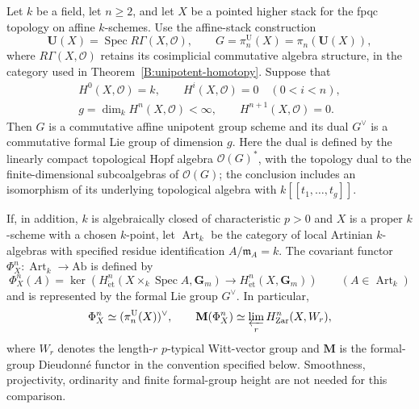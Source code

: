 \begin{theorem}\label{B:formal-homotopy}
Let $k$ be a field, let $n\geq2$, and let $X$ be a pointed higher stack
for the fpqc topology on affine $k$-schemes.  Use the affine-stack
construction
\[
 \mathbf U(X)=\operatorname{Spec}R\Gamma(X,\mathcal O),
 \qquad G=\pi_n^{\mathrm U}(X)=\pi_n(\mathbf U(X)),
\]
where $R\Gamma(X,\mathcal O)$ retains its cosimplicial commutative
algebra structure, in the category used in
Theorem~\ref{B:unipotent-homotopy}.
Suppose that
\[
 \begin{gathered}
 H^0(X,\mathcal O)=k,\qquad
 H^i(X,\mathcal O)=0\quad(0<i<n),\\
 g=\dim_k H^n(X,\mathcal O)<\infty,
 \qquad H^{n+1}(X,\mathcal O)=0.
 \end{gathered}
\]
Then $G$ is a commutative affine unipotent group scheme and its dual
$G^\vee$ is a commutative formal Lie group of dimension $g$.
Here the dual is defined by the linearly compact topological Hopf algebra
$\mathcal O(G)^*$, with the topology dual to the finite-dimensional
subcoalgebras of $\mathcal O(G)$; the conclusion includes an isomorphism
of its underlying topological algebra with $k[[t_1,\ldots,t_g]]$.

If, in addition, $k$ is algebraically closed of characteristic $p>0$
and $X$ is a proper $k$-scheme with a chosen $k$-point, let
$\operatorname{Art}_k$ be the category of local Artinian $k$-algebras
with specified residue identification $A/\mathfrak m_A=k$.  The covariant functor $\Phi_X^n:\operatorname{Art}_k\to\mathrm{Ab}$
is defined by
\[
 \Phi_X^n(A)=\ker\!\left(
 H^n_{\mathrm{\acute et}}(X\times_k\operatorname{Spec}A,\mathbf G_m)
 \longrightarrow H^n_{\mathrm{\acute et}}(X,\mathbf G_m)\right)
 \qquad(A\in\operatorname{Art}_k)
\]
and is represented by the formal Lie group $G^\vee$.  In particular,
\[
 \Phi_X^n\simeq (\pi_n^{\mathrm U}(X))^\vee,
 \qquad
 \mathbf M(\Phi_X^n)
 \simeq \varprojlim_r H^n_{\mathrm{Zar}}(X,W_r),
\]
where $W_r$ denotes the length-$r$ $p$-typical Witt-vector group and
$\mathbf M$ is the formal-group Dieudonn\'e functor in the convention
specified below.  Smoothness, projectivity, ordinarity and finite
formal-group height are not needed for this comparison.
\end{theorem}

